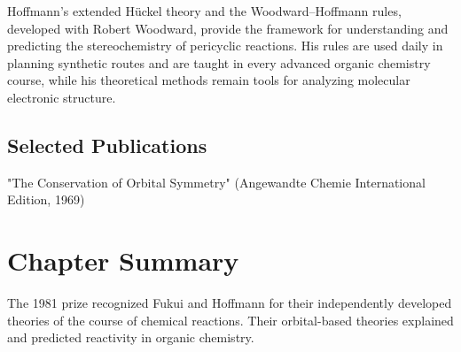 Hoffmann's extended Hückel theory and the Woodward–Hoffmann rules, developed with Robert Woodward, provide the framework for understanding and predicting the stereochemistry of pericyclic reactions. His rules are used daily in planning synthetic routes and are taught in every advanced organic chemistry course, while his theoretical methods remain tools for analyzing molecular electronic structure.

\subsection*{Selected Publications}

"The Conservation of Orbital Symmetry" (Angewandte Chemie International Edition, 1969)

\clearpage

\section*{Chapter Summary}

The 1981 prize recognized Fukui and Hoffmann for their independently developed theories of the course of chemical reactions. Their orbital-based theories explained and predicted reactivity in organic chemistry.

